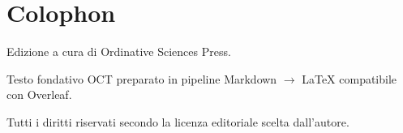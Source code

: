 \chapter*{Colophon}

Edizione a cura di Ordinative Sciences Press.

Testo fondativo OCT preparato in pipeline Markdown $\to$ LaTeX compatibile con Overleaf.

Tutti i diritti riservati secondo la licenza editoriale scelta dall'autore.
